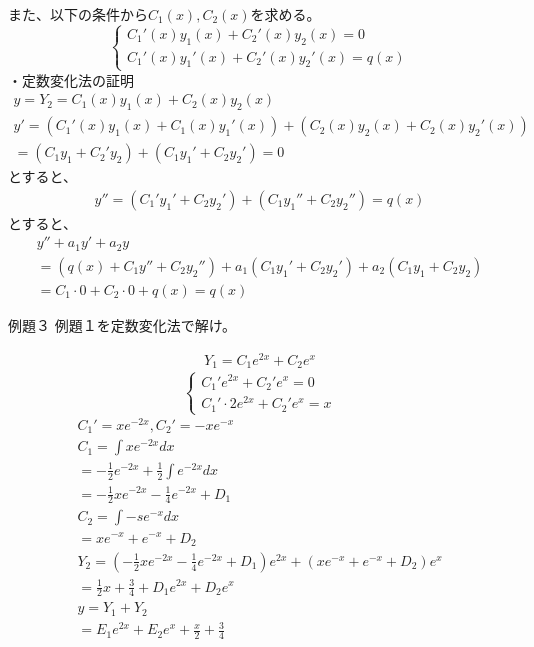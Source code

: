 \documentclass{jsarticle}
\begin{document}
また、以下の条件から$C_1(x),C_2(x)$を求める。
\begin{displaymath}
\left\{
\begin{array}{l}
C_1'(x)y_1(x)+C_2'(x)y_2(x)=0  \\
C_1'(x)y_1'(x)+C_2'(x)y_2'(x)=q(x)
\end{array}
\right.
\end{displaymath}
・定数変化法の証明
\begin{eqnarray}
y=Y_2=C_1(x)y_1(x)+C_2(x)y_2(x)\\
y'=(C_1'(x)y_1(x)+C_1(x)y_1'(x))+(C_2(x)y_2(x)+C_2(x)y_2'(x))\\
=(C_1y_1+C_2'y_2)+(C_1y_1'+C_2y_2')=0
\end{eqnarray}
とすると、
\begin{eqnarray}
y''=(C_1'y_1'+C_2y_2')+(C_1y_1''+C_2y_2'')=q(x)
\end{eqnarray}
とすると、
\begin{eqnarray}
y''+a_1y'+a_2y\\
=(q(x)+C_1y''+C_2y_2'')+a_1(C_1y_1'+C_2y_2')+a_2(C_1y_1+C_2y_2)\\
=C_1\cdot 0+C_2\cdot 0+q(x)=q(x)
\end{eqnarray}
\begin{itembox}[l]{例題３}
例題１を定数変化法で解け。
\end{itembox}
\begin{eqnarray}
Y_1=C_1e^{2x}+C_2e^x
\end{eqnarray}
\begin{displaymath}
\left\{
\begin{array}{l}
C_1'e^{2x}+C_2'e^x=0  \\
C_1'\cdot 2e^{2x}+C_2'e^x=x
\end{array}
\right.
\end{displaymath}
\begin{eqnarray}
C_1'=xe^{-2x},C_2'=-xe^{-x}\\
C_1=\int xe^{-2x}dx\\
=-\frac{1}{2}e^{-2x}+\frac{1}{2}\int e^{-2x}dx\\
=-\frac{1}{2}xe^{-2x}-\frac{1}{4}e^{-2x}+D_1\\
C_2=\int -se^{-x}dx\\
=xe^{-x}+e^{-x}+D_2\\
Y_2=\left(-\frac{1}{2}xe^{-2x}-\frac{1}{4}e^{-2x}+D_1\right)e^{2x}+(xe^{-x}+e^{-x}+D_2)e^x\\
=\frac{1}{2}x+\frac{3}{4}+D_1e^{2x}+D_2e^x\\
y=Y_1+Y_2\\
=E_1e^{2x}+E_2e^x+\frac{x}{2}+\frac{3}{4}
\end{eqnarray}
\end{document}
